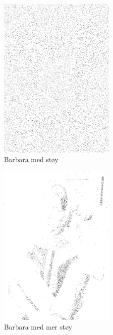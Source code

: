 \documentclass[a4paper, 12pt]{article}
\begin{document}
\begin{figure}[h]
  \centering
  \includegraphics[width=0.5\textwidth]{images/barbara-noise-1}
  \caption{Barbara med støy}
  \label{fig:barbara-noise-1}
\end{figure}

\begin{figure}[h]
  \centering
  \includegraphics[width=0.5\textwidth]{images/barbara-noise-2}
  \caption{Barbara med mer støy}
  \label{fig:barbara-noise-2}
\end{figure}
\end{document}
